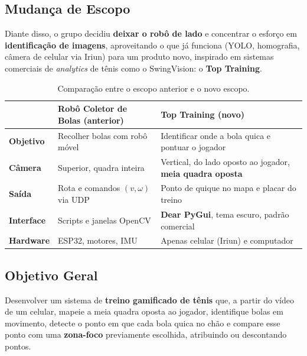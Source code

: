 \documentclass[a4paper,11pt]{article}
\begin{document}
\subsection{Mudança de Escopo}
Diante disso, o grupo decidiu \textbf{deixar o robô de lado} e concentrar o esforço em \textbf{identificação de imagens}, aproveitando o que já funciona (YOLO, homografia, câmera de celular via Iriun) para um produto novo, inspirado em sistemas comerciais de \textit{analytics} de tênis como o SwingVision: o \textbf{Top Training}.

\begin{table}[H]
\centering
\small
\renewcommand{\arraystretch}{1.25}
\caption{Comparação entre o escopo anterior e o novo escopo.}
\label{tab:escopo}
\begin{tabularx}{\textwidth}{>{\bfseries}p{3.2cm} X X}
\toprule
 & \textbf{Robô Coletor de Bolas (anterior)} & \textbf{Top Training (novo)} \\
\midrule
Objetivo & Recolher bolas com robô móvel & Identificar onde a bola quica e pontuar o jogador \\
\rowcolor{rowgray}
Câmera & Superior, quadra inteira & Vertical, do lado oposto ao jogador, \textbf{meia quadra oposta} \\
Saída & Rota e comandos $(v,\omega)$ via UDP & Ponto de quique no mapa e placar do treino \\
\rowcolor{rowgray}
Interface & Scripts e janelas OpenCV & \textbf{Dear PyGui}, tema escuro, padrão comercial \\
Hardware & ESP32, motores, IMU & Apenas celular (Iriun) e computador \\
\bottomrule
\end{tabularx}
\end{table}

\subsection{Objetivo Geral}
Desenvolver um sistema de \textbf{treino gamificado de tênis} que, a partir do vídeo de um celular, mapeie a meia quadra oposta ao jogador, identifique bolas em movimento, detecte o ponto em que cada bola quica no chão e compare esse ponto com uma \textbf{zona-foco} previamente escolhida, atribuindo ou descontando pontos.
\end{document}
